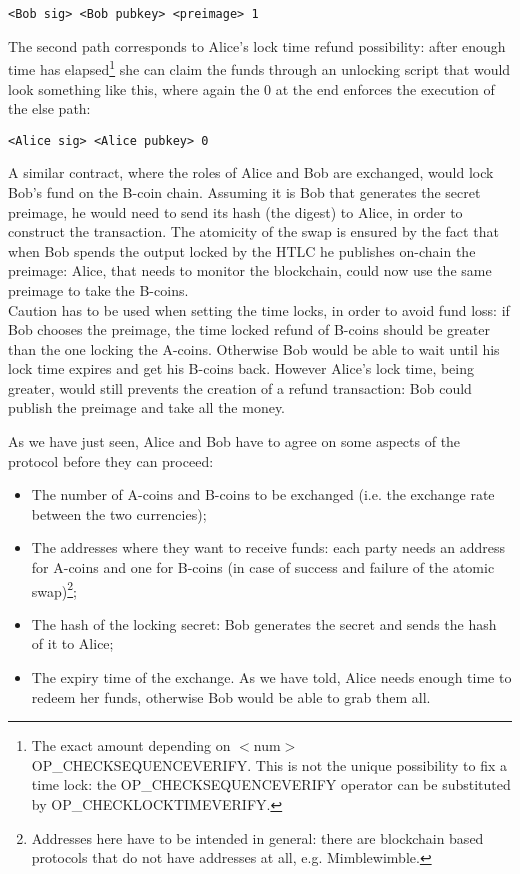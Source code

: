 \bigskip

\begin{lstlisting}[frame=single]
<Bob sig> <Bob pubkey> <preimage> 1
\end{lstlisting}

\bigskip
\noindent
The second path corresponds to Alice's lock time refund possibility: after enough time has elapsed\footnote{The exact amount depending on $<$num$>$ OP\_CHECKSEQUENCEVERIFY. This is not the unique possibility to fix a time lock: the OP\_CHECKSEQUENCEVERIFY operator can be substituted by OP\_CHECKLOCKTIMEVERIFY.} she can claim the funds through an unlocking script that would look something like this, where again the 0 at the end enforces the execution of the else path:

\bigskip

\begin{lstlisting}[frame=single]
<Alice sig> <Alice pubkey> 0
\end{lstlisting}

\bigskip
\noindent
A similar contract, where the roles of Alice and Bob are exchanged, would lock Bob's fund on the B-coin chain. Assuming it is Bob that generates the secret preimage, he would need to send its hash (the digest) to Alice, in order to construct the transaction. The atomicity of the swap is ensured by the fact that when Bob spends the output locked by the HTLC he publishes on-chain the preimage: Alice, that needs to monitor the blockchain, could now use the same preimage to take the B-coins.
\\
Caution has to be used when setting the time locks, in order to avoid fund loss: if Bob chooses the preimage, the time locked refund of B-coins should be greater than the one locking the A-coins. Otherwise Bob would be able to wait until his lock time expires and get his B-coins back. However Alice's lock time, being greater, would still prevents the creation of a refund transaction: Bob could publish the preimage and take all the money.

\bigskip
\noindent
As we have just seen, Alice and Bob have to agree on some aspects of the protocol before they can proceed:
\begin{itemize}
	\item The number of A-coins and B-coins to be exchanged (i.e. the exchange rate between the two currencies);
	\item The addresses where they want to receive funds: each party needs an address for A-coins and one for B-coins (in case of success and failure of the atomic swap)\footnote{Addresses here have to be intended in general: there are blockchain based protocols that do not have addresses at all, e.g. Mimblewimble.};
	\item The hash of the locking secret: Bob generates the secret and sends the hash of it to Alice;
	\item The expiry time of the exchange. As we have told, Alice needs enough time to redeem her funds, otherwise Bob would be able to grab them all.
\end{itemize}

